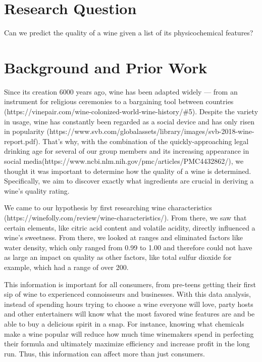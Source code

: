\documentclass[11pt]{article}
\begin{document}
    \section{Research Question}\label{research-question}

    Can we predict the quality of a wine given a list of its physicochemical
features?

    \section{Background and Prior Work}\label{background-and-prior-work}

    Since its creation 6000 years ago, wine has been adapted widely --- from
an instrument for religious ceremonies to a bargaining tool between
countries (https://vinepair.com/wine-colonized-world-wine-history/\#5).
Despite the variety in usage, wine has constantly been regarded as a
social device and has only risen in popularity
(https://www.svb.com/globalassets/library/images/svb-2018-wine-report.pdf).
That's why, with the combination of the quickly-approaching legal
drinking age for several of our group members and its increasing
appearance in social
media(https://www.ncbi.nlm.nih.gov/pmc/articles/PMC4432862/), we thought
it was important to determine how the quality of a wine is determined.
Specifically, we aim to discover exactly what ingredients are crucial in
deriving a wine's quality rating.

We came to our hypothesis by first researching wine characteristics
(https://winefolly.com/review/wine-characteristics/). From there, we saw
that certain elements, like citric acid content and volatile acidity,
directly influenced a wine's sweetness. From there, we looked at ranges
and eliminated factors like water density, which only ranged from 0.99
to 1.00 and therefore could not have as large an impact on quality as
other factors, like total sulfur dioxide for example, which had a range
of over 200.

This information is important for all consumers, from pre-teens getting
their first sip of wine to experienced connoisseurs and businesses. With
this data analysis, instead of spending hours trying to choose a wine
everyone will love, party hosts and other entertainers will know what
the most favored wine features are and be able to buy a delicious spirit
in a snap. For instance, knowing what chemicals make a wine popular will
reduce how much time winemakers spend in perfecting their formula and
ultimately maximize efficiency and increase profit in the long run.
Thus, this information can affect more than just consumers.
\end{document}
